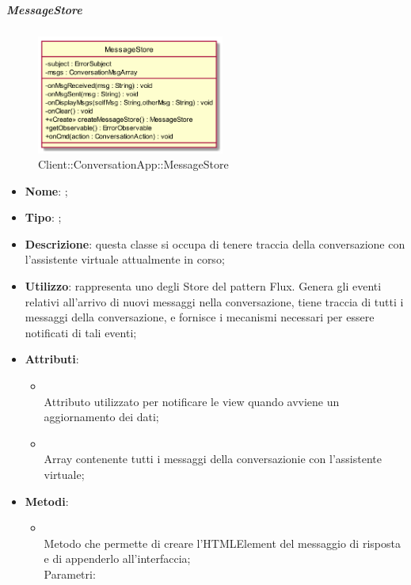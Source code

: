 \hypertarget{MessageStore_label}{\subparagraph{MessageStore}}
\begin{figure}[h]
	\centering
	\includegraphics[width=0.55\textwidth,height=\textheight,keepaspectratio]{images/ClassMessageStore.png}
	\caption{Client::ConversationApp::MessageStore}
\end{figure}
\begin{itemize}
	\item \textbf{Nome}: ;
	\item \textbf{Tipo}: ;
	\item \textbf{Descrizione}: questa classe si occupa di tenere traccia della conversazione con l'assistente virtuale attualmente in corso;
	\item \textbf{Utilizzo}: rappresenta uno degli Store del pattern Flux. Genera gli eventi relativi all'arrivo di nuovi messaggi nella conversazione, tiene traccia di tutti i messaggi della conversazione, e fornisce i mecanismi necessari per essere notificati di tali eventi;
	\item \textbf{Attributi}:
	\begin{itemize}
		\item[]  \\
		Attributo utilizzato per notificare le view quando avviene un aggiornamento dei dati;
		\item[]  \\
		Array contenente tutti i messaggi della conversazionie con l'assistente virtuale;
	\end{itemize}
	\item \textbf{Metodi}:
	\begin{itemize}
		\item[]  \\		Metodo che permette di creare l'HTMLElement del messaggio di risposta e di appenderlo all'interfaccia;\\
		Parametri:
		\begin{itemize}

\end{itemize}
\end{itemize}
\end{itemize}
